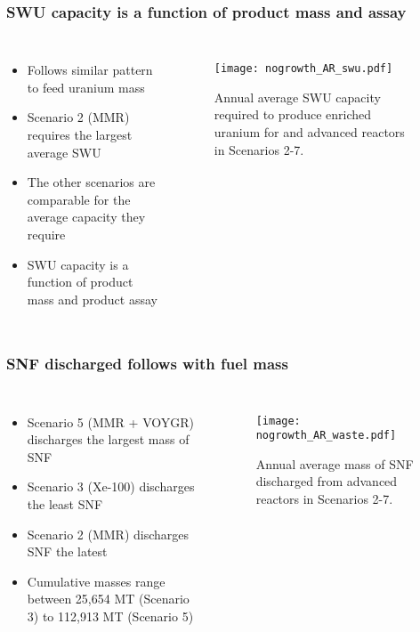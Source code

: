 \begin{frame}
    \frametitle{\gls{SWU} capacity is a function of product mass and assay}
    \begin{columns}
        \column[t]{4.3cm}
            \begin{itemize}
                \item Follows similar pattern to feed uranium  mass 
                \item Scenario 2 (MMR) requires the largest average \gls{SWU} 
                \item The other scenarios are comparable for the average 
                      capacity they require
                \item \gls{SWU} capacity is a function of product mass and 
                      product assay
                
            \end{itemize}
        \column[t]{5.7cm}
        \vspace{-1cm}
        \begin{figure}
                \centering
                \texttt{[image: nogrowth\_AR\_swu.pdf]}
                \caption{Annual average \gls{SWU} capacity required to produce 
                enriched uranium for and advanced reactors in Scenarios 2-7.}
                \label{fig:swu}
        \end{figure}
    \end{columns}
\end{frame}

\begin{frame}
    \frametitle{\gls{SNF} discharged follows with fuel mass}
    \begin{columns}
        \column[t]{4.3cm}
            \begin{itemize}
                \item Scenario 5 (MMR + VOYGR) discharges the largest mass of \gls{SNF}
                \item Scenario 3 (Xe-100) discharges the least \gls{SNF}
                \item Scenario 2 (MMR) discharges \gls{SNF} the latest
                \item Cumulative masses range between 25,654 MT (Scenario 3) to 
                      112,913 MT (Scenario 5)
                
            \end{itemize}
        \column[t]{5.7cm}
        \vspace{-1cm}
        \begin{figure}
                \centering
                \texttt{[image: nogrowth\_AR\_waste.pdf]}
                \caption{Annual average mass of \gls{SNF} discharged from 
                advanced reactors in Scenarios 2-7.}
                \label{fig:waste}
        \end{figure}
    \end{columns}
\end{frame}